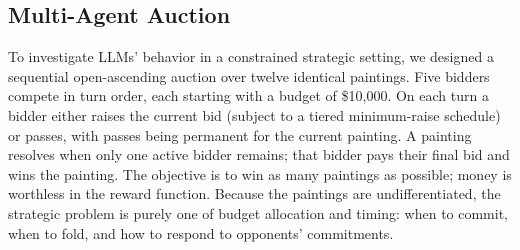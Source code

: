 


\subsection{Multi-Agent Auction}
To investigate LLMs' behavior in a constrained strategic setting, we designed a sequential open-ascending auction over twelve identical paintings. Five bidders compete in turn order, each starting with a budget of \$10,000. On each turn a bidder either raises the current bid (subject to a tiered minimum-raise schedule) or passes, with passes being permanent for the current painting. A painting resolves when only one active bidder remains; that bidder pays their final bid and wins the painting. The objective is to win as many paintings as possible; money is worthless in the reward function. Because the paintings are undifferentiated, the strategic problem is purely one of budget allocation and timing: when to commit, when to fold, and how to respond to opponents' commitments.

